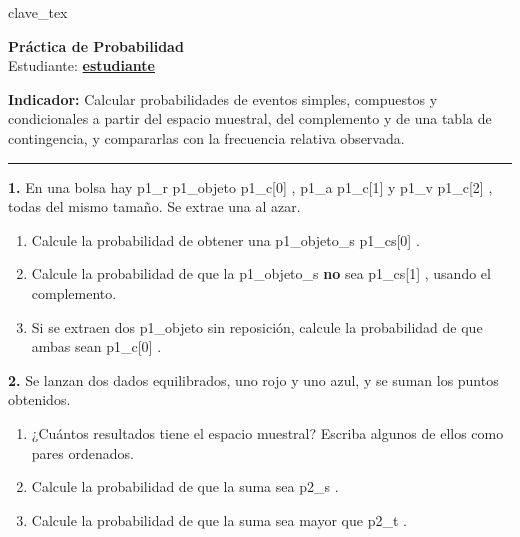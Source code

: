 \documentclass[10pt]{article}
\begin{document}
{{ clave_tex }}          %
{%

\label{inicio_{{ estudiante_id }}}                 %
\begin{center}
    {\Large \textbf{Práctica de Probabilidad}}\\[0.3em]
    {\normalsize Estudiante: \textbf{\underline{ {{ estudiante }} }} }
\end{center}

\vspace{0.15cm}

\noindent\textbf{Indicador:} Calcular probabilidades de eventos simples, compuestos y condicionales a partir del espacio muestral, del complemento y de una tabla de contingencia, y compararlas con la frecuencia relativa observada.

\vspace{0.1cm}

\noindent{}

\vspace{0.1cm}
\hrule
\vspace{0.15cm}

{%

\textbf{1. } En una bolsa hay {{ p1_r }} {{ p1_objeto }} {{ p1_c[0] }}, {{ p1_a }} {{ p1_c[1] }} y {{ p1_v }} {{ p1_c[2] }}, todas del mismo tamaño. Se extrae una al azar.
\begin{enumerate}
\item[\small a)] Calcule la probabilidad de obtener una {{ p1_objeto_s }} {{ p1_cs[0] }}.
\item[\small b)] Calcule la probabilidad de que la {{ p1_objeto_s }} \textbf{no} sea {{ p1_cs[1] }}, usando el complemento.
\item[\small c)] Si se extraen dos {{ p1_objeto }} sin reposición, calcule la probabilidad de que ambas sean {{ p1_c[0] }}.
\end{enumerate}

\vspace{0.3cm}

\textbf{2. } Se lanzan dos dados equilibrados, uno rojo y uno azul, y se suman los puntos obtenidos.
\begin{enumerate}
\item[\small a)] ¿Cuántos resultados tiene el espacio muestral? Escriba algunos de ellos como pares ordenados.
\item[\small b)] Calcule la probabilidad de que la suma sea {{ p2_s }}.
\item[\small c)] Calcule la probabilidad de que la suma sea mayor que {{ p2_t }}.
\end{enumerate}

}}
\end{document}
